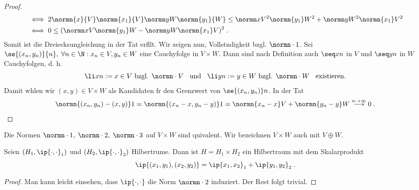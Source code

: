 \begin{proof}
\begin{align*}
	&\iff 2 \normn{x}{V}\normn{x_1}{V} \normn yW \normn{y_1}{W} \leq \normn xV^2 \normn{y_1}W^2 + \normn yW^2 \normn{x_1}V^2\\ 
	&\iff 0 \leq  (\normn xV \normn{y_1}W - \normn yW \normn{x_1}V)^2\;.
	\end{align*}
	Somit ist die Dreiecksungleichung in der Tat erf\us llt. Wir zeigen nun, Vollst\as ndigkeit bzgl. \(\normn\cdot 1\). Sei \(\se{(x_n, y_n)}{n},
	\; \forall n\in \N: x_n \in V, y_n \in W\) eine Cauchyfolge in \(V\times W\). Dann sind nach Definition auch \(\seq xn\) in $V$ und \(\seq yn\) in $W$ Cauchyfolgen, d. h. 
	\[\li xn := x \in V\text{ bzgl. } \normn\cdot V \;\;\text{ und }\;\;\li yn := y \in W\text{ bzgl. } \normn\cdot W \;\;\text{ existieren.}\]
	Damit w\as hlen wir \((x,y) \in V\times W\) als Kandidaten f\us r den Grenzwert von \(\se{(x_n, y_n)}n\). In der Tat
	\[\normn{(x_n, y_n) - (x,y)}1 = \normn{(x_n - x, y_n -y)}1 = \normn{x_n -x}V + \normn{y_n - y}W \overset{n\to\infty}{\longrightarrow} 0 \;.\]
\end{proof}
\begin{rem}
	Die Normen \(\normn\cdot 1,\;\normn\cdot 2,\; \normn\cdot 3\) auf \(V\times W\) sind 
	\as quivalent. Wir bezeichnen \(V\times W\) auch mit \(V\oplus W\).
\end{rem}

\begin{theorem}
	Seien \((H_1, \ip{\cdot, \cdot}_1)\) und \((H_2, \ip{\cdot, \cdot}_2)\) Hilbertr\as ume. 
	Dann ist \(H = H_1 \times H_2\) ein Hilbertraum mit dem Skalarprodukt
	\[\ip{(x_1,y_1), (x_2,y_2)} = \ip{x_1,x_2}_1 + \ip{y_1,y_2}_2\;.\]
\end{theorem}
\begin{proof}
	Man kann leicht einsehen, dass \(\ip{\cdot,\cdot}\) die Norm \(\normn\cdot 2 \) induziert. Der Rest folgt trivial.
\end{proof}


